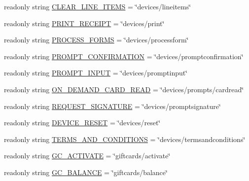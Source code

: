 \begin{DoxyCompactItemize}
\item 
readonly string \mbox{\hyperlink{class_form_sim_1_1_rest_handler_a5b324ad107b08c3bdf9f5fc7814db39c}{C\+L\+E\+A\+R\+\_\+\+L\+I\+N\+E\+\_\+\+I\+T\+E\+MS}} = \char`\"{}devices/lineitems\char`\"{}
\item 
readonly string \mbox{\hyperlink{class_form_sim_1_1_rest_handler_a0d509105eef3e65ade61d66f22ee08ea}{P\+R\+I\+N\+T\+\_\+\+R\+E\+C\+E\+I\+PT}} = \char`\"{}devices/print\char`\"{}
\item 
readonly string \mbox{\hyperlink{class_form_sim_1_1_rest_handler_a072db72ff3cc31ecf995ad17c145f4b4}{P\+R\+O\+C\+E\+S\+S\+\_\+\+F\+O\+R\+MS}} = \char`\"{}devices/processform\char`\"{}
\item 
readonly string \mbox{\hyperlink{class_form_sim_1_1_rest_handler_af90c44f10cd5ead89606b811fc5ae632}{P\+R\+O\+M\+P\+T\+\_\+\+C\+O\+N\+F\+I\+R\+M\+A\+T\+I\+ON}} = \char`\"{}devices/promptconfirmation\char`\"{}
\item 
readonly string \mbox{\hyperlink{class_form_sim_1_1_rest_handler_a78226012d7df7c27ae747c20674ca706}{P\+R\+O\+M\+P\+T\+\_\+\+I\+N\+P\+UT}} = \char`\"{}devices/promptinput\char`\"{}
\item 
readonly string \mbox{\hyperlink{class_form_sim_1_1_rest_handler_ac8898c2c9addec5b05604700655dbbe9}{O\+N\+\_\+\+D\+E\+M\+A\+N\+D\+\_\+\+C\+A\+R\+D\+\_\+\+R\+E\+AD}} = \char`\"{}devices/prompts/cardread\char`\"{}
\item 
readonly string \mbox{\hyperlink{class_form_sim_1_1_rest_handler_affa0a3f303002458dbca9c7cb7dc41a7}{R\+E\+Q\+U\+E\+S\+T\+\_\+\+S\+I\+G\+N\+A\+T\+U\+RE}} = \char`\"{}devices/promptsignature\char`\"{}
\item 
readonly string \mbox{\hyperlink{class_form_sim_1_1_rest_handler_add1d76cf837e4fae753b1f625b801fc8}{D\+E\+V\+I\+C\+E\+\_\+\+R\+E\+S\+ET}} = \char`\"{}devices/reset\char`\"{}
\item 
readonly string \mbox{\hyperlink{class_form_sim_1_1_rest_handler_af1397ea44e81584c26bcb257d9ce5769}{T\+E\+R\+M\+S\+\_\+\+A\+N\+D\+\_\+\+C\+O\+N\+D\+I\+T\+I\+O\+NS}} = \char`\"{}devices/termsandconditions\char`\"{}
\item 
readonly string \mbox{\hyperlink{class_form_sim_1_1_rest_handler_a8742d658aaab597957ada79707565406}{G\+C\+\_\+\+A\+C\+T\+I\+V\+A\+TE}} = \char`\"{}giftcards/activate\char`\"{}
\item 
readonly string \mbox{\hyperlink{class_form_sim_1_1_rest_handler_a91a3268dfe038eac25dc4b294e863fd8}{G\+C\+\_\+\+B\+A\+L\+A\+N\+CE}} = \char`\"{}giftcards/balance\char`\"{}

\end{DoxyCompactItemize}
